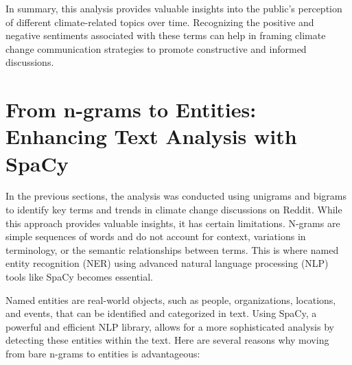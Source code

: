 In summary, this analysis provides valuable insights into the public's perception of different climate-related topics over time. Recognizing the positive and negative sentiments associated with these terms can help in framing climate change communication strategies to promote constructive and informed discussions.

\section{From n-grams to Entities: Enhancing Text Analysis with SpaCy}
In the previous sections, the analysis was conducted using unigrams and bigrams to identify key terms and trends in climate change discussions on Reddit. While this approach provides valuable insights, it has certain limitations. N-grams are simple sequences of words and do not account for context, variations in terminology, or the semantic relationships between terms. This is where named entity recognition (NER) using advanced natural language processing (NLP) tools like SpaCy becomes essential.

Named entities are real-world objects, such as people, organizations, locations, and events, that can be identified and categorized in text. Using SpaCy, a powerful and efficient NLP library, allows for a more sophisticated analysis by detecting these entities within the text. Here are several reasons why moving from bare n-grams to entities is advantageous:

